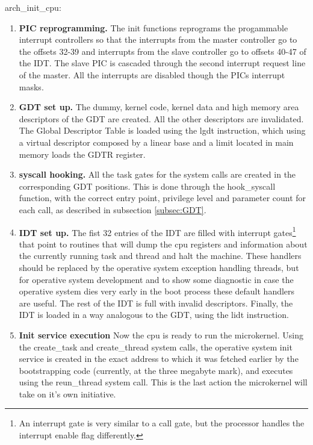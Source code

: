 \documentclass[11pt, letterpaper, twoside, english]{book}
\begin{document}
\textsf{arch\_init\_cpu}: 
\begin{enumerate}
\item[]\textbf{PIC reprogramming.} The init functions reprograms the progammable interrupt controllers so that the interrupts from the master controller go to the offsets 32-39 and interrupts from the slave controller go to offsets 40-47 of the IDT. The slave PIC is cascaded through the second interrupt request line of the master. All the interrupts are disabled though the PICs interrupt masks.
\item[]\textbf{GDT set up.} The dummy, kernel code, kernel data and high memory area descriptors of the GDT are created. All the other descriptors are invalidated. The Global Descriptor Table is loaded using the \textsf{lgdt} instruction, which using a virtual descriptor composed by a linear base and a limit located in main memory loads the GDTR register.
\item[]\textbf{syscall hooking.} All the task gates for the system calls are created in the corresponding GDT positions. This is done through the \textsf{hook\_syscall} function, with the correct entry point, privilege level and parameter count for each call, as described in subsection \ref{subsec:GDT}.
\item[]\textbf{IDT set up.} The fist 32 entries of the IDT are filled with interrupt gates\footnote{An interrupt gate is very similar to a call gate, but the processor handles the interrupt enable flag differently.} that point to routines that will dump the cpu registers and information about the currently running task and thread and halt the machine. These handlers should be replaced by the operative system exception handling threads, but for operative system development and to show some diagnostic in case the operative system dies very early in the boot process these default handlers are useful. The rest of the IDT is full with invalid descriptors. Finally, the IDT is loaded in a way analogous to the GDT, using the \textsf{lidt} instruction.
\item[]\textbf{Init service execution} Now the cpu is ready to run the microkernel. Using the \textsf{create\_task} and \textsf{create\_thread} system calls, the operative system init service is created in the exact address to which it was fetched earlier by the bootstrapping code (currently, at the three megabyte mark), and executes using the \textsf{reun\_thread} system call. This is the last action the microkernel will take on it's own initiative.
\end{enumerate}
\end{document}
